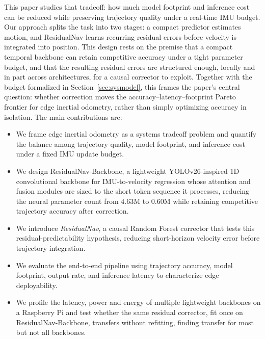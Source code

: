 \documentclass[10pt,conference,letterpaper]{IEEEtran}
\begin{document}
This paper studies that tradeoff: how much model footprint and
inference cost can be reduced while preserving trajectory quality
under a real-time IMU budget. Our approach splits the task into two
stages: a compact predictor estimates motion, and ResidualNav
learns recurring residual errors before velocity is integrated into
position. This design rests on the premise that a compact temporal
backbone can retain competitive accuracy under a tight parameter
budget, and that the resulting residual errors are structured enough,
locally and in part across architectures, for a causal corrector to
exploit. Together with the budget formalized in
Section~\ref{sec:sysmodel}, this frames the paper's central question:
whether correction moves the accuracy--latency--footprint Pareto
frontier for edge inertial odometry, rather than simply optimizing
accuracy in isolation. The main contributions are:
\begin{itemize}
  \item We frame edge inertial odometry as a systems tradeoff problem and quantify the balance among trajectory quality, model footprint, and inference cost under a fixed IMU update budget.
  \item We design ResidualNav-Backbone, a lightweight YOLOv26-inspired 1D convolutional backbone for IMU-to-velocity regression whose attention and fusion modules are sized to the short token sequence it processes, reducing the neural parameter count from 4.63M to 0.60M while retaining competitive trajectory accuracy after correction.
  \item We introduce \textit{ResidualNav}, a causal Random Forest corrector that tests this residual-predictability hypothesis, reducing short-horizon velocity error before trajectory integration.
  \item We evaluate the end-to-end pipeline using trajectory accuracy, model footprint, output rate, and inference latency to characterize edge deployability.
  \item We profile the latency, power and energy of multiple lightweight backbones on a Raspberry Pi and test whether the same residual corrector, fit once on ResidualNav-Backbone, transfers without refitting, finding transfer for most but not all backbones.
\end{itemize}

\end{document}
